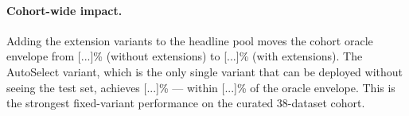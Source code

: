 \paragraph{Cohort-wide impact.}
Adding the extension variants to the headline pool moves the cohort
oracle envelope from [...]\% (without extensions) to [...]\%
(with extensions). The AutoSelect variant, which is the only single
variant that can be deployed without seeing the test set, achieves
[...]\% — within [...]\% of the oracle envelope. This is the
strongest fixed-variant performance on the curated 38-dataset
cohort.


